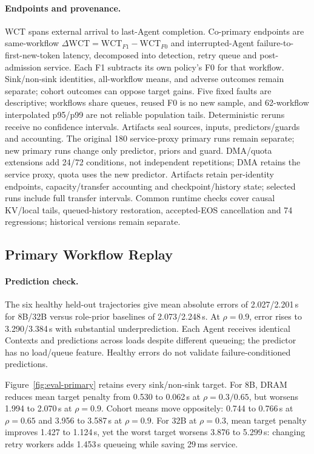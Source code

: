 \paragraph{Endpoints and provenance.}
WCT spans external arrival to last-Agent completion. Co-primary endpoints
are same-workflow $\Delta\mathrm{WCT}=\mathrm{WCT}_{F1}-\mathrm{WCT}_{F0}$
and interrupted-Agent failure-to-first-new-token latency, decomposed into
detection, retry queue and post-admission service. Each F1 subtracts its own
policy's F0 for that workflow. Sink/non-sink identities, all-workflow means,
and adverse outcomes remain separate; cohort outcomes can oppose target gains.
Five fixed faults
are descriptive; workflows share queues, reused F0 is no new sample, and
62-workflow interpolated p95/p99 are not reliable population tails.
Deterministic reruns receive no confidence intervals.
Artifacts seal sources, inputs, predictors/guards and accounting. The original
180 service-proxy primary runs remain separate; new primary runs change only
predictor, priors and guard. DMA/quota extensions add 24/72 conditions, not independent
repetitions; DMA retains the service proxy, quota uses the new predictor.
Artifacts retain per-identity endpoints, capacity/transfer accounting and
checkpoint/history state; selected runs include full transfer intervals.
Common runtime checks cover causal KV/local tails, queued-history
restoration, accepted-EOS cancellation and 74 regressions; historical versions
remain separate.

\subsection{Primary Workflow Replay}
\label{sec:eval-primary}
\paragraph{Prediction check.}
The six healthy held-out trajectories give mean absolute errors of
2.027/2.201\,s for 8B/32B versus role-prior baselines of 2.073/2.248\,s.
At $\rho=0.9$, error rises to 3.290/3.384\,s with substantial underprediction.
Each Agent receives identical Contexts and predictions across loads despite
different queueing; the predictor has no load/queue feature. Healthy errors
do not validate failure-conditioned predictions.

Figure~\ref{fig:eval-primary} retains every sink/non-sink target.
For 8B, DRAM reduces mean target penalty from 0.530 to 0.062\,s at
$\rho=0.3/0.65$, but worsens 1.994 to 2.070\,s at $\rho=0.9$.
Cohort means move oppositely: 0.744 to 0.766\,s at $\rho=0.65$ and
3.956 to 3.587\,s at $\rho=0.9$.
For 32B at $\rho=0.3$, mean target penalty improves 1.427 to 1.124\,s,
yet the worst target worsens 3.876 to 5.299\,s: changing retry workers
adds 1.453\,s queueing while saving 29\,ms service.

